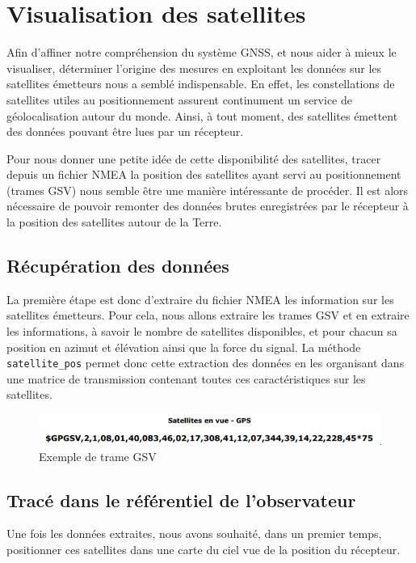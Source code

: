\section{Visualisation des satellites}\label{sec:visualisation-des-satellites}
   Afin d'affiner notre compréhension du système GNSS, et nous aider à mieux le visualiser, déterminer l'origine des mesures en exploitant les données sur les satellites émetteurs nous a semblé indispensable.
   En effet, les constellations de satellites utiles au positionnement assurent continument un service de géolocalisation autour du monde.
   Ainsi, à tout moment, des satellites émettent des données pouvant être lues par un récepteur.

   Pour nous donner une petite idée de cette disponibilité des satellites, tracer depuis un fichier NMEA la position des satellites ayant servi au positionnement (trames GSV) nous semble être une manière intéressante de procéder.
   Il est alors nécessaire de pouvoir remonter des données brutes enregistrées par le récepteur à la position des satellites autour de la Terre.

   \subsection{Récupération des données}\label{subsec:recuperation-des-donnees}
      La première étape est donc d'extraire du fichier NMEA les information sur les satellites émetteurs.
      Pour cela, nous allons extraire les trames GSV et en extraire les informations, à savoir le nombre de satellites disponibles, et pour chacun sa position en azimut et élévation ainsi que la force du signal.
      La méthode \texttt{satellite\_pos} permet donc cette extraction des données en les organisant dans une matrice de transmission contenant toutes ces caractéristiques sur les satellites.

      \begin{figure}[h]
          \centering
          \includegraphics[width=.95\textwidth]{imgs/gsv}
          \caption{Exemple de trame GSV}
          \label{fig:gsv}
      \end{figure}

   \subsection{Tracé dans le référentiel de l'observateur}\label{subsec:trace-dans-le-referentiel-de-l'observateur}
      Une fois les données extraites, nous avons souhaité, dans un premier temps, positionner ces satellites dans une carte du ciel vue de la position du récepteur.

